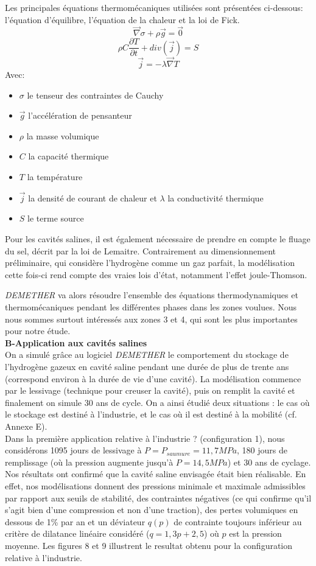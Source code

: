 \documentclass[11pt,french,a4paper]{article}
\begin{document}
Les principales équations thermomécaniques utilisées sont présentées ci-dessous: l'équation d'équilibre, l'équation de la chaleur et la loi de Fick.  
 $$\vec{\nabla}\sigma + \rho \vec{g} = \vec{0}$$
$$\rho C \frac{\partial T}{\partial t} + div(\vec{j}) = S $$
$$\vec{j} = - \lambda \vec{\nabla}T $$
Avec:
\begin{itemize}
\item $\sigma$ le tenseur des contraintes de Cauchy
\item $\vec{g}$ l'accélération de pensanteur
\item $\rho$ la masse volumique
\item $C$ la capacité thermique 
\item $T$ la température
\item $\vec{j}$  la densité de courant de chaleur et $\lambda$ la conductivité thermique
\item $S$ le terme source
\end{itemize}

Pour les cavités salines, il est également nécessaire de prendre en compte le fluage du sel, décrit par la loi de Lemaitre. Contrairement au dimensionnement préliminaire, qui considère l'hydrogène comme un gaz parfait, la modélisation cette fois-ci rend compte des vraies lois d'état, notamment l'effet joule-Thomson. 

\emph{DEMETHER} va alors résoudre l’ensemble des équations thermodynamiques et thermomécaniques pendant les différentes phases dans les zones voulues. Nous nous sommes surtout intéressés aux zones 3 et 4, qui sont les plus importantes pour notre étude. \\

\textbf{B-Application aux cavités salines}\\

On a simulé grâce au logiciel \emph{DEMETHER} le comportement du stockage de l'hydrogène gazeux en cavité saline pendant une durée de plus de trente ans (correspond environ à la durée de vie d’une cavité). La modélisation commence par le lessivage (technique pour creuser la cavité), puis on remplit la cavité et finalement on simule 30 ans de cycle. On a ainsi étudié deux situations : le cas où le stockage est destiné à l’industrie, et le cas où il est destiné à la mobilité (cf. Annexe E). \\

Dans la première application relative à l'industrie ? (configuration 1), nous considérons 1095 jours de lessivage à $P = P_{saumure} = 11,7 MPa$, 180 jours de remplissage (où la pression augmente jusqu’à $P = 14,5 MPa$) et 30 ans de cyclage. Nos résultats ont confirmé que la cavité saline envisagée était bien réalisable. En effet, nos modélisations donnent des pressions minimale et maximale admissibles par rapport aux seuils de stabilité, des contraintes négatives (ce qui confirme qu'il s'agit bien d'une compression et non d'une traction), des pertes volumiques en dessous de 1\% par an et un déviateur $q(p)$ de contrainte toujours inférieur au critère de dilatance linéaire considéré ($q = 1,3 p + 2,5$) où $p$ est la pression moyenne. Les figures 8 et 9 illustrent le resultat obtenu pour la configuration relative à l'industrie.\\
\end{document}
